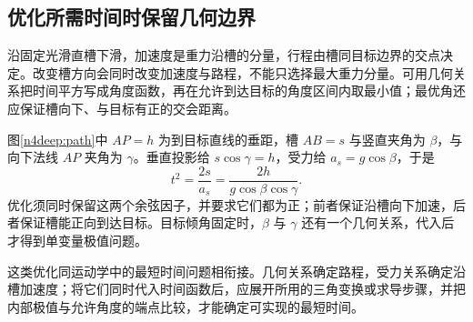 \subsection{优化所需时间时保留几何边界}
沿固定光滑直槽下滑，加速度是重力沿槽的分量，行程由槽同目标边界的交点决定。改变槽方向会同时改变加速度与路程，不能只选择最大重力分量。可用几何关系把时间平方写成角度函数，再在允许到达目标的角度区间内取最小值；最优角还应保证槽向下、与目标有正的交会距离。

图\ref{n4deep:path}中 $AP=h$ 为到目标直线的垂距，槽 $AB=s$ 与竖直夹角为 $\beta$，与向下法线 $AP$ 夹角为 $\gamma$。垂直投影给 $s\cos\gamma=h$，受力给 $a_s=g\cos\beta$，于是
\[
t^2=\frac{2s}{a_s}=\frac{2h}{g\cos\beta\cos\gamma}.
\]
优化须同时保留这两个余弦因子，并要求它们都为正；前者保证沿槽向下加速，后者保证槽能正向到达目标。目标倾角固定时，$\beta$ 与 $\gamma$ 还有一个几何关系，代入后才得到单变量极值问题。

这类优化同运动学中的最短时间问题相衔接。几何关系确定路程，受力关系确定沿槽加速度；将它们同时代入时间函数后，应展开所用的三角变换或求导步骤，并把内部极值与允许角度的端点比较，才能确定可实现的最短时间。
